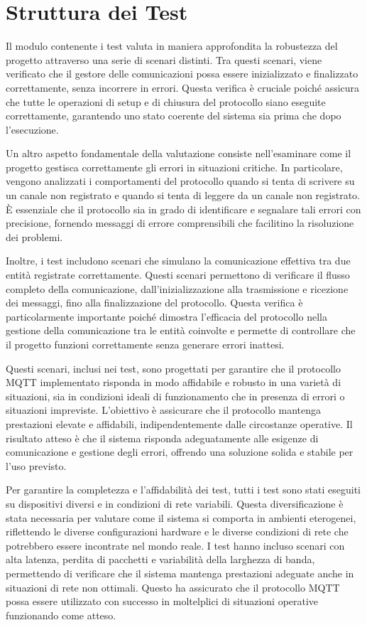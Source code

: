 \documentclass[12pt,a4paper,openright,twoside]{book}
\begin{document}
\section{Struttura dei Test}

Il modulo contenente i test valuta in maniera approfondita la robustezza del progetto attraverso una serie di scenari distinti. 
Tra questi scenari, viene verificato che il gestore delle comunicazioni possa essere inizializzato e finalizzato correttamente, senza incorrere in errori. 
Questa verifica è cruciale poiché assicura che tutte le operazioni di setup e di chiusura del protocollo siano eseguite correttamente, garantendo uno 
stato coerente del sistema sia prima che dopo l'esecuzione.

Un altro aspetto fondamentale della valutazione consiste nell'esaminare come il progetto gestisca correttamente gli errori in situazioni critiche. 
In particolare, vengono analizzati i comportamenti del protocollo quando si tenta di scrivere su un canale non registrato e quando si tenta di leggere 
da un canale non registrato. È essenziale che il protocollo sia in grado di identificare e segnalare tali errori con precisione, fornendo messaggi di 
errore comprensibili che facilitino la risoluzione dei problemi.

Inoltre, i test includono scenari che simulano la comunicazione effettiva tra due entità registrate correttamente. Questi scenari 
permettono di verificare il flusso completo della comunicazione, dall'inizializzazione alla trasmissione e ricezione dei messaggi, 
fino alla finalizzazione del protocollo. Questa verifica è particolarmente importante poiché dimostra l'efficacia del protocollo nella gestione della comunicazione 
tra le entità coinvolte e permette di controllare che il progetto funzioni correttamente senza generare errori inattesi.

Questi scenari, inclusi nei test, sono progettati per garantire che il protocollo \ac{MQTT} implementato risponda in modo affidabile e robusto in una varietà di situazioni, 
sia in condizioni ideali di funzionamento che in presenza di errori o situazioni impreviste. L'obiettivo è assicurare che il protocollo mantenga prestazioni elevate e affidabili, 
indipendentemente dalle circostanze operative. Il risultato atteso è che il sistema risponda adeguatamente alle esigenze di comunicazione e gestione degli errori, 
offrendo una soluzione solida e stabile per l'uso previsto.

Per garantire la completezza e l'affidabilità dei test, tutti i test sono stati eseguiti su dispositivi diversi e in condizioni di rete variabili. 
Questa diversificazione è stata necessaria per valutare come il sistema si comporta in ambienti eterogenei, riflettendo le diverse configurazioni hardware
e le diverse condizioni di rete che potrebbero essere incontrate nel mondo reale. I test hanno incluso scenari con alta latenza, perdita di pacchetti e 
variabilità della larghezza di banda, permettendo di verificare che il sistema mantenga prestazioni adeguate anche in situazioni di rete non ottimali. 
Questo ha assicurato che il protocollo \ac{MQTT} possa essere utilizzato con successo in moltelplici di situazioni operative funzionando come atteso.
\end{document}
